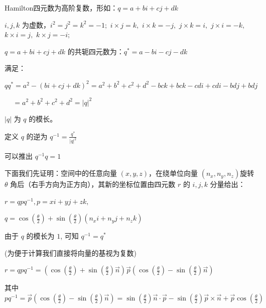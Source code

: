 \documentclass[withoutpreface,bwprint]{cumcmthesis} %
\begin{document}
Hamilton四元数为高阶复数，形如：$q=a+bi+cj+dk$ \par
$i,j,k$ 为虚数，$i^2=j^2=k^2=-1;$
$i \times j=k,$
$i \times k=-j,$
$j \times k=i,$
$j \times i=-k,$
$k \times i=j,$
$k \times j=-i;$ \par
$q=a+bi+cj+dk$ 的共轭四元数为：$q^*=a-bi-cj-dk$ \par
满足：\par
$qq^*=a^2-(bi+cj+dk)^2=a^2+b^2+c^2+d^2-bck+bck-cdi+cdi-bdj+bdj$ \par
\quad\ \ \,$=a^2+b^2+c^2+d^2=|q|^2$ \par
$|q|$ 为 $q$ 的模长。\par
定义 $q$ 的逆为 $q^{-1}=\frac{\displaystyle q^*}{\displaystyle |q|^2}$ \par
可以推出 $q^{-1}q=1$ \par
下面我们先证明：空间中的任意向量 $( x ,y ,z )$，在绕单位向量 $(n_x,n_y,n_z)$旋转 $\theta $
角后（右手方向为正方向），其新的坐标位置由四元数 $r$ 的 $i , j , k$ 分量给出：\par
$r=qpq^{-1},p=xi+yj+zk,$ \par
$q = \cos(\frac{\theta }{2}) + \sin(\frac{\theta }{2})(n_xi + 
    n_yj + n_zk)$ \par
由于 $q$ 的模长为 $1$, 可知 $q^{-1}=q^*$ \par
(为便于计算我们直接将向量的基视为复数) \par
$r = qpq^{-1} = (\cos(\frac{\theta}{2}) + 
\sin(\frac{\theta}{2})\overrightarrow{n})\overrightarrow{p} 
(\cos(\frac{\theta}{2}) - \sin(\frac{\theta}{2})
\overrightarrow{n})$ \par
其中 $pq^{-1} = \overrightarrow{p} (\cos(\frac{\theta}{2}) - 
\sin(\frac{\theta}{2})\overrightarrow{n}) = 
\sin(\frac{\theta}{2})\overrightarrow{n} \cdot \overrightarrow{p} -
\sin(\frac{\theta}{2})\overrightarrow{p} \times \overrightarrow{n} +
\overrightarrow{p} \cos(\frac{\theta}{2})$
\end{document}
